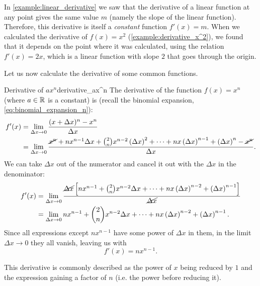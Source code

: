 In \autoref{example:linear_derivative} we saw that the derivative of a linear function at any point gives the same value $m$ (namely the slope of the linear function). Therefore, this derivative is itself a \textit{constant} function $f'(x)=m$. When we calculated the derivative of $f(x)=x^{2}$ (\autoref{example:derivative_x^2}), we found that it depends on the point where it was calculated, using the relation $f'(x)=2x$, which is a linear function with slope $2$ that goes through the origin.

Let us now calculate the derivative of some common functions.
\begin{example}{Derivative of $ax^{n}$}{derivative_ax^n}
  The derivative of the function $f(x)=x^{n}$ (where $a\in\mathbb{R}^{}$ is a constant) is (recall the binomial expansion, \autoref{eq:binomial_expansion_n}):
  \begin{align*}
    f'(x) &= \lim\limits_{\Delta x\to 0}\frac{(x+\Delta x)^{n}-x^{n}}{\Delta x}\\
          &= \lim\limits_{\Delta x\to 0}\frac{\cancel{x^{n}} + nx^{n-1}\Delta x + \binom{2}{n}x^{n-2}\left(\Delta x\right)^{2} + \dots + nx\left(\Delta x\right)^{n-1} + \left(\Delta x\right)^{n}-\cancel{x^{n}}}{\Delta x}.
  \end{align*}
  We can take $\Delta x$ out of the numerator and cancel it out with the $\Delta x$ in the denominator:
  \begin{align*}
    f'(x) &= \lim\limits_{\Delta x\to 0}\frac{\cancel{\Delta x}\left[ nx^{n-1} + \binom{2}{n}x^{n-2}\Delta x + \dots + nx\left(\Delta x\right)^{n-2} + \left(\Delta x\right)^{n-1} \right]}{\cancel{\Delta x}}\\
          &= \lim\limits_{\Delta x\to 0} nx^{n-1} + \binom{2}{n}x^{n-2}\Delta x + \dots + nx\left(\Delta x\right)^{n-2} + \left(\Delta x\right)^{n-1}.
  \end{align*}
  Since all expressions except $nx^{n-1}$ have some power of $\Delta x$ in them, in the limit $\Delta x\to 0$ they all vanish, leaving us with
  \[
    f'(x) = nx^{n-1}.
  \]

  This derivative is commonly described as the power of $x$ being reduced by $1$ and the expression gaining a factor of $n$ (i.e. the power before reducing it).
\end{example}

